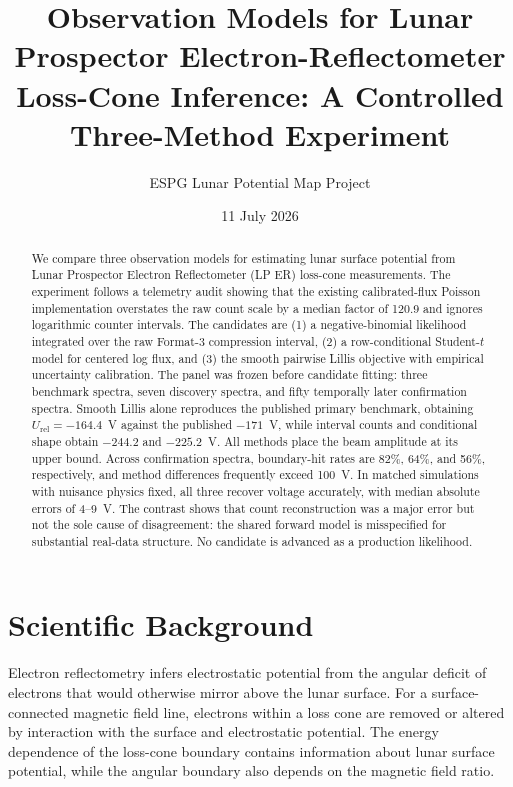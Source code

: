 \documentclass[11pt]{article}
\title{Observation Models for Lunar Prospector Electron-Reflectometer\\
Loss-Cone Inference: A Controlled Three-Method Experiment}
\author{ESPG Lunar Potential Map Project}
\date{11 July 2026}
\newcommand{\Urel}{U_{\mathrm{rel}}}
\begin{document}
\maketitle

\begin{abstract}
We compare three observation models for estimating lunar surface potential from
Lunar Prospector Electron Reflectometer (LP ER) loss-cone measurements.  The
experiment follows a telemetry audit showing that the existing calibrated-flux
Poisson implementation overstates the raw count scale by a median factor of
120.9 and ignores logarithmic counter intervals.  The candidates are (1) a
negative-binomial likelihood integrated over the raw Format-3 compression
interval, (2) a row-conditional Student-$t$ model for centered log flux, and (3)
the smooth pairwise Lillis objective with empirical uncertainty calibration.
The panel was frozen before candidate fitting: three benchmark spectra, seven
discovery spectra, and fifty temporally later confirmation spectra.  Smooth
Lillis alone reproduces the published primary benchmark, obtaining
$\Urel=-164.4$~V against the published $-171$~V, while interval counts and
conditional shape obtain $-244.2$ and $-225.2$~V.  All methods place the beam
amplitude at its upper bound.  Across confirmation spectra, boundary-hit rates
are 82\%, 64\%, and 56\%, respectively, and method differences frequently
exceed 100~V.  In matched simulations with nuisance physics fixed, all three
recover voltage accurately, with median absolute errors of 4--9~V.  The
contrast shows that count reconstruction was a major error but not the sole
cause of disagreement: the shared forward model is misspecified for substantial
real-data structure.  No candidate is advanced as a production likelihood.
\end{abstract}

\section{Scientific Background}

Electron reflectometry infers electrostatic potential from the angular deficit
of electrons that would otherwise mirror above the lunar surface.  For a
surface-connected magnetic field line, electrons within a loss cone are removed
or altered by interaction with the surface and electrostatic potential.  The
energy dependence of the loss-cone boundary contains information about lunar
surface potential, while the angular boundary also depends on the magnetic
field ratio.
\end{document}
